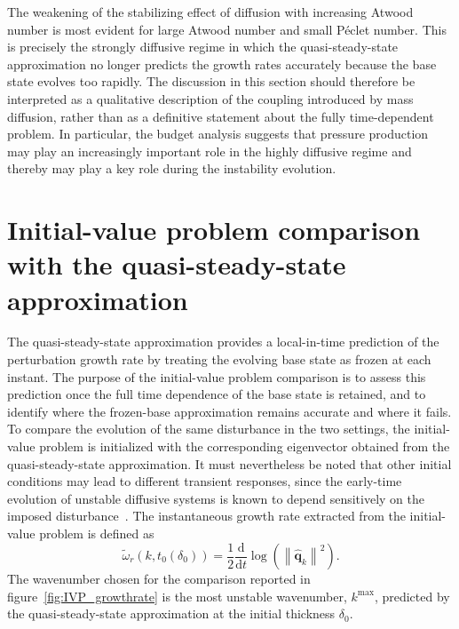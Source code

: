 \documentclass[11pt]{article}
\newcommand{\difft}[2]{\frac{\mathrm{d} #1}{\mathrm{d} #2}}
\begin{document}
The weakening of the stabilizing effect of diffusion with increasing Atwood number is most evident for large Atwood number and small P\'{e}clet number. This is precisely the strongly diffusive regime in which the quasi-steady-state approximation no longer predicts the growth rates accurately because the base state evolves too rapidly. The discussion in this section should therefore be interpreted as a qualitative description of the coupling introduced by mass diffusion, rather than as a definitive statement about the fully time-dependent problem. In particular, the budget analysis suggests that pressure production may play an increasingly important role in the highly diffusive regime and thereby may play a key role during the instability evolution.

\section{Initial-value problem comparison with the quasi-steady-state approximation}
\label{sec:IVP}
The quasi-steady-state approximation provides a local-in-time prediction of the perturbation growth rate by treating the evolving base state as frozen at each instant. The purpose of the initial-value problem comparison is to assess this prediction once the full time dependence of the base state is retained, and to identify where the frozen-base approximation remains accurate and where it fails. To compare the evolution of the same disturbance in the two settings, the initial-value problem is initialized with the corresponding eigenvector obtained from the quasi-steady-state approximation. It must nevertheless be noted that other initial conditions may lead to different transient responses, since the early-time evolution of unstable diffusive systems is known to depend sensitively on the imposed disturbance~\citep{tan-homsy-1986,rapaka-et-al-2008,don-nils-amir-2013}. The instantaneous growth rate extracted from the initial-value problem is defined as
\begin{equation}
    \tilde{\omega}_r\!\left(k,t_0(\delta_0)\right)
    =
    \frac{1}{2}\difft{}{t}\log\!\left(\left\lVert \hat{\mathbf{q}}_k \right\rVert^2\right).
\end{equation}
The wavenumber chosen for the comparison reported in figure~\ref{fig:IVP_growthrate} is the most unstable wavenumber, \(k^{\max}\), predicted by the quasi-steady-state approximation at the initial thickness \(\delta_0\).
\end{document}
